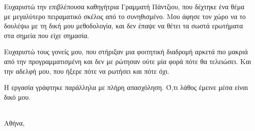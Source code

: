 %

Ευχαριστώ την επιβλέπουσα καθηγήτρια Γραμματή Πάντζιου, που δέχτηκε ένα
θέμα με μεγαλύτερο πειραματικό σκέλος από το συνηθισμένο. Μου άφησε τον
χώρο να το δουλέψω με τη δική μου μεθοδολογία, και δεν έπαψε να θέτει τα
σωστά ερωτήματα στα σημεία που είχε σημασία.

Ευχαριστώ τους γονείς μου, που στήριξαν μια φοιτητική διαδρομή αρκετά πιο
μακριά από την προγραμματισμένη και δεν με ρώτησαν ούτε μία φορά πότε θα
τελειώσει. Και την αδελφή μου, που ήξερε πότε να ρωτήσει και πότε όχι.

Η εργασία γράφτηκε παράλληλα με πλήρη απασχόληση. Ό,τι λάθος έμεινε μέσα
είναι δικό μου.

\vspace{2em}
\begin{flushright}
\thAuthorEL\\
Αθήνα, \the\year
\end{flushright}
